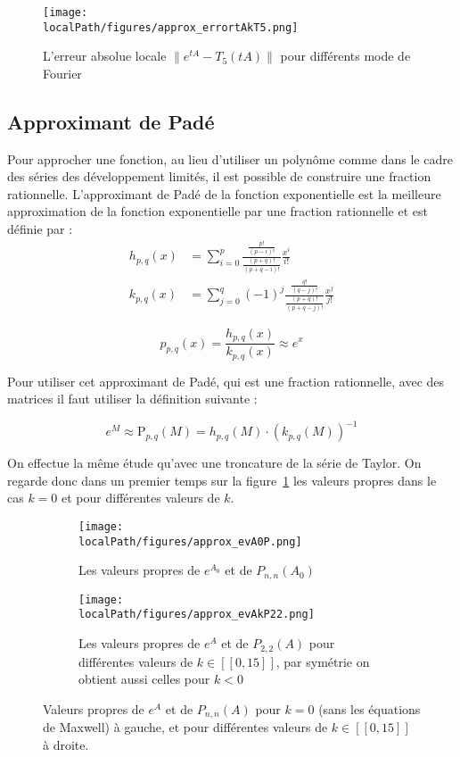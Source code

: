\begin{figure}
  \centering
  \texttt{[image: \\localPath/figures/approx\_errortAkT5.png]}
  \caption{L'erreur absolue locale $\|e^{tA}-T_5(tA)\|$ pour différents mode de Fourier}
\end{figure}

\subsection{Approximant de Padé}

Pour approcher une fonction, au lieu d'utiliser un polynôme comme dans le cadre des séries des développement limités, il est possible de construire une fraction rationnelle. L'approximant de Padé de la fonction exponentielle est la meilleure approximation de la fonction exponentielle par une fraction rationnelle et est définie par :
$$
  \begin{aligned}
    h_{p,q}(x) &= \sum_{i=0}^p \frac{\frac{p!}{(p-i)!}}{\frac{(p+q)!}{(p+q-i)!}}\frac{x^i}{i!} \\
    k_{p,q}(x) &= \sum_{j=0}^q (-1)^j \frac{\frac{q!}{(q-j)!}}{\frac{(p+q)!}{(p+q-j)!}} \frac{x^j}{j!}
  \end{aligned}
$$

$$
  p_{p,q}(x) = \frac{h_{p,q}(x)}{k_{p,q}(x)} \approx e^x
$$

Pour utiliser cet approximant de Padé, qui est une fraction rationnelle, avec des matrices il faut utiliser la définition suivante :

$$
  e^M \approx \textrm{P}_{p,q}(M) = h_{p,q}(M)\cdot\left(k_{p,q}(M)\right)^{-1}
$$

On effectue la même étude qu'avec une troncature de la série de Taylor. On regarde donc dans un premier temps sur la figure~\ref{fig:evAP22} les valeurs propres dans le cas $k=0$ et pour différentes valeurs de $k$.

\begin{figure}
  \begin{subfigure}{.5\textwidth}
    \centering
    \texttt{[image: \\localPath/figures/approx\_evA0P.png]}
    \caption{Les valeurs propres de $e^{A_0}$ et de $P_{n,n}(A_0)$}
  \end{subfigure}
  \begin{subfigure}{.5\textwidth}
    \centering
    \texttt{[image: \\localPath/figures/approx\_evAkP22.png]}
    \caption{Les valeurs propres de $e^{A}$ et de $P_{2,2}(A)$ pour différentes valeurs de $k\in[\![0,15]\!]$, par symétrie on obtient aussi celles pour $k<0$}
  \end{subfigure}
  \caption{Valeurs propres de $e^{A}$ et de $P_{n,n}(A)$ pour $k=0$ (sans les équations de Maxwell) à gauche, et pour différentes valeurs de $k\in[\![0,15]\!]$ à droite.}
  \label{fig:evAP22}
\end{figure}

